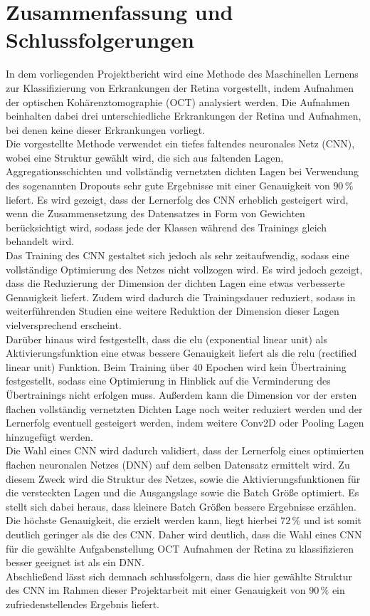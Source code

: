 \section{Zusammenfassung und Schlussfolgerungen}

In dem vorliegenden Projektbericht wird eine Methode des Maschinellen Lernens zur Klassifizierung von Erkrankungen der Retina vorgestellt, indem Aufnahmen der optischen Kohärenztomographie (OCT) analysiert werden. Die Aufnahmen beinhalten dabei drei unterschiedliche Erkrankungen der Retina und Aufnahmen, bei denen keine dieser Erkrankungen vorliegt.\\
Die vorgestellte Methode verwendet ein tiefes faltendes neuronales Netz (CNN), wobei eine Struktur gewählt wird, die sich aus faltenden Lagen, Aggregationsschichten und vollständig vernetzten dichten Lagen bei Verwendung des sogenannten Dropouts sehr gute Ergebnisse mit einer Genauigkeit von $90\,\%$ liefert. Es wird gezeigt, dass der Lernerfolg des CNN erheblich gesteigert wird, wenn die Zusammensetzung des Datensatzes in Form von Gewichten berücksichtigt wird, sodass jede der Klassen während des Trainings gleich behandelt wird.\\
Das Training des CNN gestaltet sich jedoch als sehr zeitaufwendig, sodass eine vollständige Optimierung des Netzes nicht vollzogen wird. Es wird jedoch gezeigt, dass die Reduzierung der Dimension der dichten Lagen eine etwas verbesserte Genauigkeit liefert. Zudem wird dadurch die Trainingsdauer reduziert, sodass in weiterführenden Studien eine weitere Reduktion der Dimension dieser Lagen vielversprechend erscheint. \\
Darüber hinaus wird festgestellt, dass die elu (exponential linear unit) als Aktivierungsfunktion eine etwas bessere Genauigkeit liefert als die relu (rectified linear unit) Funktion. Beim Training über 40 Epochen wird kein Übertraining festgestellt, sodass eine Optimierung in Hinblick auf die Verminderung des Übertrainings nicht erfolgen muss. Außerdem kann die Dimension vor der ersten flachen vollständig vernetzten Dichten Lage noch weiter reduziert werden und der Lernerfolg eventuell gesteigert werden, indem weitere Conv2D oder Pooling Lagen hinzugefügt werden. \\
Die Wahl eines CNN wird dadurch validiert, dass der Lernerfolg eines optimierten flachen neuronalen Netzes (DNN) auf dem selben Datensatz ermittelt wird. Zu diesem Zweck wird die Struktur des Netzes, sowie die Aktivierungsfunktionen für die versteckten Lagen und die Ausgangslage sowie die Batch Größe optimiert. Es stellt sich dabei heraus, dass kleinere Batch Größen bessere Ergebnisse erzählen. Die höchste Genauigkeit, die erzielt werden kann, liegt hierbei $72\,\%$ und ist somit deutlich geringer als die des CNN. Daher wird deutlich, dass die Wahl eines CNN für die gewählte Aufgabenstellung OCT Aufnahmen der Retina zu klassifizieren besser geeignet ist als ein DNN. \\
Abschließend lässt sich demnach schlussfolgern, dass die hier gewählte Struktur des CNN im Rahmen dieser Projektarbeit mit einer Genauigkeit von $90\,\%$ ein zufriedenstellendes Ergebnis liefert. \\